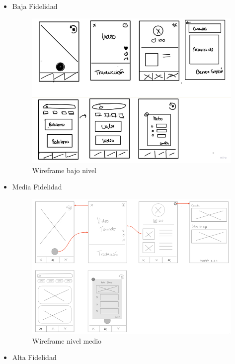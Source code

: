 \newpage
\begin{itemize}
    \item Baja Fidelidad

        \begin{figure} [H]
            \centering
            \includegraphics[width=0.8\linewidth]{figuras/wireframe_baja.png}
            \caption{Wireframe bajo nivel}
            \label{fig:enter-label}
        \end{figure}
    
    \item Media Fidelidad

        \begin{figure} [H]
            \centering
            \includegraphics[width=0.9\linewidth]{figuras/wireframe_media.png}
            \caption{Wireframe nivel medio}
            \label{fig:enter-label}
        \end{figure}

    \newpage
    \item Alta Fidelidad


\end{itemize}
